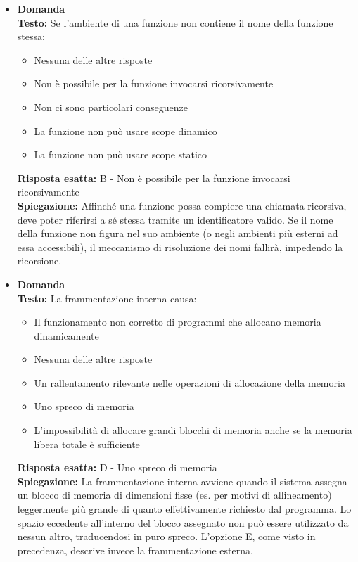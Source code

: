 \documentclass[12pt, a4paper]{article}
\newcounter{domandateoria}
\begin{document}
\begin{itemize}
    \item {}\textbf{Domanda \thedomandateoria} \\
    \textbf{Testo:} Se l'ambiente di una funzione non contiene il nome della funzione stessa:
    \begin{itemize}
        \item[A)] Nessuna delle altre risposte
        \item[B)] Non è possibile per la funzione invocarsi ricorsivamente
        \item[C)] Non ci sono particolari conseguenze
        \item[D)] La funzione non può usare scope dinamico
        \item[E)] La funzione non può usare scope statico
    \end{itemize}
    \textbf{Risposta esatta:} B - Non è possibile per la funzione invocarsi ricorsivamente \\
    \textbf{Spiegazione:} Affinché una funzione possa compiere una chiamata ricorsiva, deve poter riferirsi a sé stessa tramite un identificatore valido. Se il nome della funzione non figura nel suo ambiente (o negli ambienti più esterni ad essa accessibili), il meccanismo di risoluzione dei nomi fallirà, impedendo la ricorsione.
    \vspace{0.3cm}

    \item {}\textbf{Domanda \thedomandateoria} \\
    \textbf{Testo:} La frammentazione interna causa:
    \begin{itemize}
        \item[A)] Il funzionamento non corretto di programmi che allocano memoria dinamicamente
        \item[B)] Nessuna delle altre risposte
        \item[C)] Un rallentamento rilevante nelle operazioni di allocazione della memoria
        \item[D)] Uno spreco di memoria
        \item[E)] L'impossibilità di allocare grandi blocchi di memoria anche se la memoria libera totale è sufficiente
    \end{itemize}
    \textbf{Risposta esatta:} D - Uno spreco di memoria \\
    \textbf{Spiegazione:} La frammentazione interna avviene quando il sistema assegna un blocco di memoria di dimensioni fisse (es. per motivi di allineamento) leggermente più grande di quanto effettivamente richiesto dal programma. Lo spazio eccedente all'interno del blocco assegnato non può essere utilizzato da nessun altro, traducendosi in puro spreco. L'opzione E, come visto in precedenza, descrive invece la frammentazione esterna.
    \vspace{0.3cm}


\end{itemize}
\end{document}

